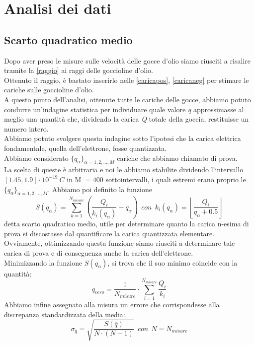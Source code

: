 
\section{Analisi dei dati}
\subsection{Scarto quadratico medio}
    Dopo aver preso le misure sulle velocità delle gocce d'olio siamo riusciti a risalire tramite la \eqref{raggio} ai raggi delle goccioline d'olio.\\
    Ottenuto il raggio, è bastato inserirlo nelle \eqref{caricapos}, \eqref{caricaneg} per stimare le cariche sulle goccioline d'olio.\\
    A questo punto dell'analisi, ottenute tutte le cariche delle gocce, abbiamo potuto condurre un'indagine statistica per individuare quale valore \textit{q} approssimasse al meglio una quantità che, dividendo la carica \textit{Q} totale della goccia, restituisse un numero intero.\\
    Abbiamo potuto svolgere questa indagine sotto l'ipotesi che la carica elettrica fondamentale, quella dell'elettrone, fosse quantizzata.\\
    Abbiamo considerato $\{q_\alpha\}_{\alpha=1,2,\dots,M}$ cariche che abbiamo chiamato di prova.\\
    La scelta di queste è arbitraria e noi le abbiamo stabilite dividendo l'intervallo $\left[1.45,1.9\right]\cdot10^{-19}~C$ in M $=400$ sottointervalli, i quali estremi erano proprio le $\{q_\alpha\}_{\alpha=1,2,\dots,M}$.
    Abbiamo poi definito la funzione 
        $$S(q_\alpha)=\sum_{k=1}^{N_{misure}} \left( \frac{Q_i}{k_i(q_\alpha)} - q_\alpha\right) ~~con~~ k_i(q_\alpha)=\left\lfloor \frac{Q_i}{q_\alpha + 0.5} \right\rfloor$$
    detta scarto quadratico medio, utile per determinare quanto la carica n-esima di prova si discostasse dal quantificare la carica quantizzata elementare.\\
    Ovviamente, ottimizzando questa funzione siamo riusciti a determinare tale carica di prova e di conseguenza anche la carica dell'elettrone.\\
    Minimizzando la funzione $S(q_\alpha)$, si trova che il suo minimo coincide con la quantità:
        $$q_{vero}=\frac{1}{N_{misure}}\cdot \sum_{i=1}^{N_{misure}} \frac{Q_i}{k_i}$$
    Abbiamo infine assegnato alla misura un errore che corrispondesse alla discrepanza standardizzata della media:
        $$\sigma_{\overline{q}} = \sqrt{\frac{S(\overline{q})}{N \cdot (N-1)}} ~~con~~ N=N_{misure}$$

